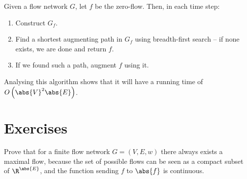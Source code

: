 \documentclass[nobib]{tufte-handout}
\begin{document}
\begin{definition}
    Given a flow network $G$, let $f$ be the zero-flow. Then, in each time step:
    \begin{enumerate}
        \item Construct $G_f$.
        \item Find a shortest augmenting path in $G_f$ using breadth-first search -- if none exists, we are done and return $f$.
        \item If we found such a path, augment $f$ using it.
    \end{enumerate}

    Analysing this algorithm shows that it will have a running time of $O\left(\abs{V}^2\abs{E}\right)$.
\end{definition}

\section{Exercises}

\begin{xca}
    Prove that for a finite flow network $G = (V,E,w)$ there always exists a maximal flow, because the set of possible flows can be seen as a compact subset of $\R^{\abs{E}}$, and the function sending $f$ to $\abs{f}$ is continuous.
\end{xca}

%
%
\end{document}
